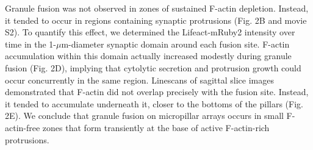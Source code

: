 
Granule fusion was not observed in zones of sustained F-actin depletion. Instead, it tended to occur in regions containing synaptic protrusions (Fig. 2B and movie S2). To quantify this effect, we determined the Lifeact-mRuby2 intensity over time in the 1-$\mu$m-diameter synaptic domain around each fusion site. F-actin accumulation within this domain actually increased modestly during granule fusion (Fig. 2D), implying that cytolytic secretion and protrusion growth could occur concurrently in the same region. Linescans of sagittal slice images demonstrated that F-actin did not overlap precisely with the fusion site. Instead, it tended to accumulate underneath it, closer to the bottoms of the pillars (Fig. 2E). We conclude that granule fusion on micropillar arrays occurs in small F-actin-free zones that form transiently at the base of active F-actin-rich protrusions.




